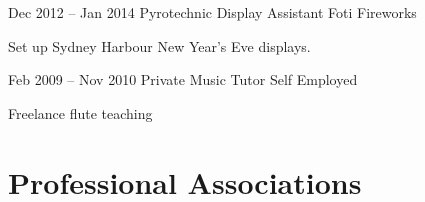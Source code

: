 \documentclass[a4paper]{friggeri-cv} %
\newcommand\shortdot[1]{
\vspace{-\parsep}
\vspace{-1em}
\begin{itemize*}
#1
\end{itemize*} 
}
\begin{document}






\entry
{Dec 2012 -- Jan 2014}
{Pyrotechnic Display Assistant}
{Foti Fireworks}
{
\shortdot{
   \item Set up Sydney Harbour New Year's Eve displays.
}
}



\entry
{Feb 2009 -- Nov 2010}
{Private Music Tutor}
{Self Employed}
{
\shortdot{
   \item Freelance flute teaching
}
}









\begin{comment}
\section{interests}




\entry
{}
{Professional}
{}
{
\shortdot{
    \item Renewable energy integration, demand side management, programming, electronics
}
}

\entry
{}
{Personal}
{}
{
\shortdot{
    \item Tae Kwon Do, unicycling, juggling, home-made electronics projects, flute%
}
}


\end{comment}


\section{Professional Associations}
\end{document}
